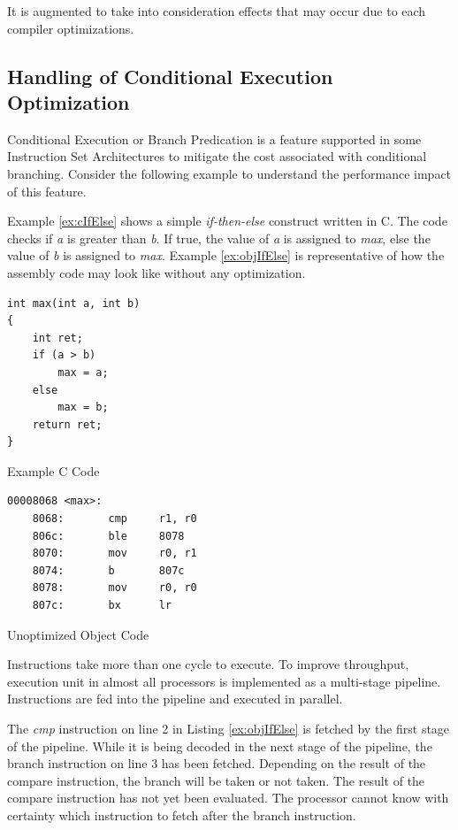 It is augmented to take into consideration effects that may occur due to each compiler optimizations. 

\subsection{Handling of Conditional Execution Optimization}
\label{subsec:CondExec}
Conditional Execution or Branch Predication is a feature supported in some Instruction Set Architectures to mitigate the cost associated with conditional branching. Consider the following example to understand the performance impact of this feature.

Example \ref{ex:cIfElse} shows a simple \emph{if-then-else} construct written in C. The code checks if \emph{a} is greater than \emph{b}. If true, the value of \emph{a} is assigned to \emph{max}, else the value of \emph{b} is assigned to \emph{max}. Example \ref{ex:objIfElse} is representative of how the assembly code may look like without any optimization.

\begin{Example}[h]
\begin{lstlisting}
int max(int a, int b)
{
    int ret;
    if (a > b)
        max = a;
    else
        max = b;
    return ret;
}
\end{lstlisting}
\caption{Example C Code}
\label{ex:cIfElse}
\end{Example}

\begin{Example}[h]
\begin{lstlisting}
00008068 <max>:
    8068:       cmp     r1, r0
    806c:       ble     8078   
    8070:       mov     r0, r1
    8074:       b       807c
    8078:       mov     r0, r0
    807c:       bx      lr
\end{lstlisting}
\caption{Unoptimized Object Code}
\label{ex:objIfElse}
\end{Example}

Instructions take more than one cycle to execute. To improve throughput, execution unit in almost all processors is implemented as a multi-stage pipeline. Instructions are fed into the pipeline and executed in parallel.

The \emph{cmp} instruction on line 2 in Listing \ref{ex:objIfElse} is fetched by the first stage of the pipeline. While it is being decoded in the next stage of the pipeline, the branch instruction on line 3 has been fetched. Depending on the result of the compare instruction, the branch will be taken or not taken. The result of the compare instruction has not yet been evaluated. The processor cannot know with certainty which instruction to fetch after the branch instruction.

